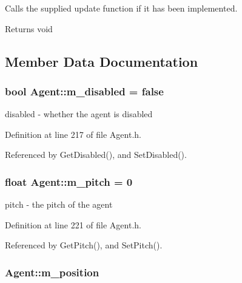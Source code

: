 Calls the supplied update function if it has been implemented. 

\begin{DoxyReturn}{Returns}
void 
\end{DoxyReturn}


\subsection{Member Data Documentation}
\subsubsection[{\texorpdfstring{m\+\_\+disabled}{m_disabled}}]{\setlength{\rightskip}{0pt plus 5cm}bool Agent\+::m\+\_\+disabled = false\hspace{0.3cm}{\ttfamily [protected]}}\hypertarget{struct_agent_aa0d2f2202888755e79f3d8022e79d816}{}\label{struct_agent_aa0d2f2202888755e79f3d8022e79d816}


disabled -\/ whether the agent is disabled 



Definition at line 217 of file Agent.\+h.



Referenced by Get\+Disabled(), and Set\+Disabled().

\subsubsection[{\texorpdfstring{m\+\_\+pitch}{m_pitch}}]{\setlength{\rightskip}{0pt plus 5cm}float Agent\+::m\+\_\+pitch = 0\hspace{0.3cm}{\ttfamily [protected]}}\hypertarget{struct_agent_aec2384613e952e3f4e280985743f41ce}{}\label{struct_agent_aec2384613e952e3f4e280985743f41ce}


pitch -\/ the pitch of the agent 



Definition at line 221 of file Agent.\+h.



Referenced by Get\+Pitch(), and Set\+Pitch().

\subsubsection[{\texorpdfstring{m\+\_\+position}{m_position}}]{ Agent\+::m\+\_\+position\hspace{0.3cm}{\ttfamily [protected]}}\hypertarget{struct_agent_aba44b4b1781713d1ec074b079c5dc4e1}{}\label{struct_agent_aba44b4b1781713d1ec074b079c5dc4e1}


